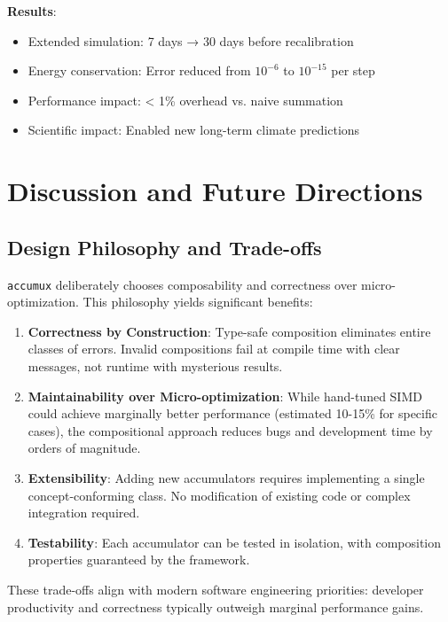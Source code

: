 \documentclass[sigconf]{acmart}
\newcommand{\accumux}{\texttt{accumux}\xspace}
\begin{document}
\textbf{Results}:
\begin{itemize}
\item Extended simulation: 7 days → 30 days before recalibration
\item Energy conservation: Error reduced from $10^{-6}$ to $10^{-15}$ per step
\item Performance impact: < 1\% overhead vs. naive summation
\item Scientific impact: Enabled new long-term climate predictions
\end{itemize}

\section{Discussion and Future Directions}

\subsection{Design Philosophy and Trade-offs}

\accumux deliberately chooses composability and correctness over micro-optimization. This philosophy yields significant benefits:

\begin{enumerate}
\item \textbf{Correctness by Construction}: Type-safe composition eliminates entire classes of errors. Invalid compositions fail at compile time with clear messages, not runtime with mysterious results.

\item \textbf{Maintainability over Micro-optimization}: While hand-tuned SIMD could achieve marginally better performance (estimated 10-15\% for specific cases), the compositional approach reduces bugs and development time by orders of magnitude.

\item \textbf{Extensibility}: Adding new accumulators requires implementing a single concept-conforming class. No modification of existing code or complex integration required.

\item \textbf{Testability}: Each accumulator can be tested in isolation, with composition properties guaranteed by the framework.
\end{enumerate}

These trade-offs align with modern software engineering priorities: developer productivity and correctness typically outweigh marginal performance gains.
\end{document}
